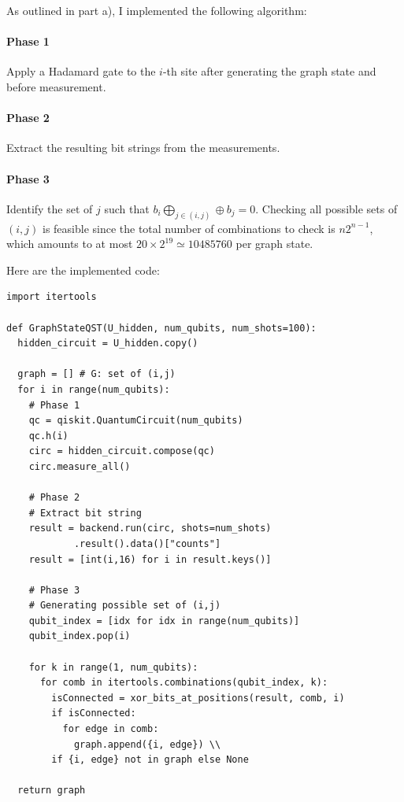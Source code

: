 \documentclass[a4paper, 11pt]{article}
\begin{document}
As outlined in part a), I implemented the following algorithm:
\paragraph{Phase 1} Apply a Hadamard gate to the $i$-th site after generating the graph state and before measurement.
\paragraph{Phase 2} Extract the resulting bit strings from the measurements.
\paragraph{Phase 3} Identify the set of $j$ such that $b_{i} \bigoplus_{j \in (i,j)} \oplus b_{j} = 0$.
Checking all possible sets of $(i,j)$ is feasible since the total number of combinations to check is $n2^{n-1}$, which amounts to at most $20 \times 2^19 \simeq 10485760$ per graph state.  

Here are the implemented code:
\begin{verbatim}
import itertools

def GraphStateQST(U_hidden, num_qubits, num_shots=100):
  hidden_circuit = U_hidden.copy()

  graph = [] # G: set of (i,j)
  for i in range(num_qubits):
    # Phase 1
    qc = qiskit.QuantumCircuit(num_qubits)
    qc.h(i)
    circ = hidden_circuit.compose(qc)
    circ.measure_all()

    # Phase 2
    # Extract bit string
    result = backend.run(circ, shots=num_shots)
            .result().data()["counts"]
    result = [int(i,16) for i in result.keys()]

    # Phase 3
    # Generating possible set of (i,j)
    qubit_index = [idx for idx in range(num_qubits)]
    qubit_index.pop(i)
    
    for k in range(1, num_qubits):
      for comb in itertools.combinations(qubit_index, k):
        isConnected = xor_bits_at_positions(result, comb, i)
        if isConnected:
          for edge in comb:
            graph.append({i, edge}) \\
        if {i, edge} not in graph else None
  
  return graph
\end{verbatim}
\end{document}
